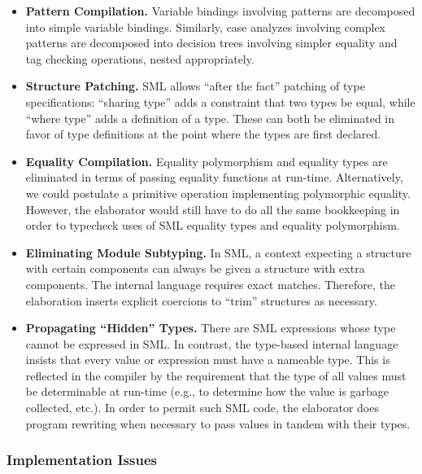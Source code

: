 \documentclass[twoside]{article}
\begin{document}
\begin{itemize}
\item \textbf{Pattern Compilation. } Variable bindings involving patterns
are decomposed into simple variable
bindings.  Similarly, case analyzes involving complex patterns are
decomposed into decision trees involving simpler equality and tag
checking operations, nested appropriately.

\item \textbf{Structure Patching. } SML allows ``after the fact'' patching
of type specifications: ``sharing type'' adds a constraint that two types be
equal, while ``where type'' adds a definition of a type.  These
can both be eliminated in favor of type definitions at the point
where the types are first declared.

\item \textbf{Equality Compilation. } Equality polymorphism and
equality types are eliminated in terms of passing equality functions
at run-time.  Alternatively, we could postulate a primitive operation
implementing polymorphic equality.  However, the elaborator would
still have to do all the same bookkeeping in order to typecheck uses
of SML equality types and equality polymorphism.

\item \textbf{Eliminating Module Subtyping. } In SML, a context
expecting a structure with certain components can always be given a
structure with extra components.  The internal language requires
exact matches.  Therefore, the elaboration inserts explicit coercions to
``trim'' structures as necessary.

\item \textbf{Propagating ``Hidden'' Types. }  There are
SML expressions whose type cannot be expressed in SML.  In
contrast, the type-based internal language insists that every value or
expression must have a nameable type.  This is reflected in the
compiler by the requirement that the type of all values must be
determinable at run-time (e.g., to determine how the value is garbage
collected, etc.).  In order to permit such SML code, the elaborator
does program rewriting when necessary to pass values in tandem with
their types.
\end{itemize}

\subsubsection{Implementation Issues}
\end{document}
